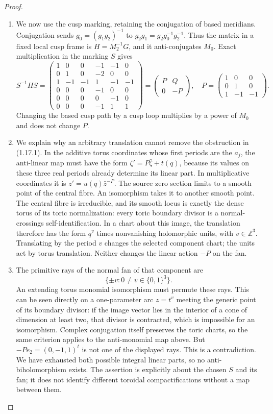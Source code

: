 \documentclass[11pt,a4paper]{article}
\theoremstyle{definition}
\begin{document}
\begin{proof}
\begin{enumerate}[label=\arabic*.]
\item We now use the cusp marking, retaining the conjugation of based
meridians.  Conjugation sends
$g_0=(g_1g_2)^{-1}$ to $g_2g_1=g_2g_0^{-1}g_2^{-1}$.
Thus the matrix in a fixed local cusp frame is
$H=M_2^{-1}G$, and it anti-conjugates $M_0$.
Exact multiplication in the marking $S$ gives
\[
S^{-1}HS=
\begin{pmatrix}
1&0&0&-1&-1&0\\
0&1&0&-2&0&0\\
1&-1&-1&1&-1&-1\\
0&0&0&-1&0&0\\
0&0&0&0&-1&0\\
0&0&0&-1&1&1
\end{pmatrix}
=\begin{pmatrix}P&Q\\0&-P\end{pmatrix},\quad
P=\begin{pmatrix}1&0&0\\0&1&0\\1&-1&-1\end{pmatrix}.
\tag{1.17.1}
\]
Changing the based cusp path by a cusp loop multiplies by a power of
$M_0$ and does not change $P$.

\item We explain why an arbitrary translation cannot remove the obstruction
in (1.17.1).  In the additive torus coordinates whose first periods
are the $a_j$, the anti-linear map must have the form
$\zeta' =P\bar\zeta+t(q)$, because its values on these three real
periods already determine its linear part.  In multiplicative
coordinates it is
$z'=u(q)\bar z^{-P}$.
The source zero section limits to a smooth point of the central fibre.
An isomorphism takes it to another smooth point.  The central fibre
is irreducible, and its smooth locus is exactly the dense torus of
its toric normalization: every toric boundary divisor is a
normal-crossings self-identification.  In a chart about this image,
the translation therefore has the form $q^v$ times nonvanishing
holomorphic units, with $v\in\mathbb Z^3$.  Translating by the period
$v$ changes the selected component chart; the units act by torus
translation.  Neither changes the linear action $-P$ on the fan.

\item The primitive rays of the normal fan of that component are
\[
\{\pm v:0\ne v\in\{0,1\}^3\}.
\]
An extending torus monomial isomorphism must permute these rays.
This can be seen directly on a one-parameter arc $z=t^v$ meeting the
generic point of its boundary divisor: if the image vector lies in
the interior of a cone of dimension at least two, that divisor is
contracted, which is impossible for an isomorphism.  Complex
conjugation itself preserves the toric charts, so the same criterion
applies to the anti-monomial map above.
But $-Pe_2=(0,-1,1)^t$ is not one of the displayed rays.
This is a contradiction.  We have exhausted both possible integral
linear parts, so no anti-biholomorphism exists.
The assertion is explicitly about the chosen $S$ and its fan; it does
not identify different toroidal compactifications without a map
between them.


\end{enumerate}
\end{proof}
\end{document}
